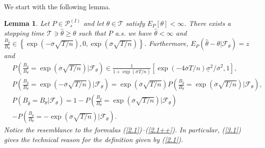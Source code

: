 \documentclass{amsart}
\newtheorem{lem}[thm]{Lemma}
\numberwithin{equation}{section}
\begin{document}
We start with the following lemma.
\begin{lem}\label{lem3.1}
Let $P\in \mathcal P^{(I)}_s$ and let $\theta\in\mathcal T$ satisfy $E_P[\theta]<\infty$.
There exists a stopping time $\mathcal T\ni\hat\theta\geq\theta$ such that $P$ a.s. we have
$\hat\theta<\infty$ and
$\frac{B_{\hat\theta}}{B_{\theta}}\in \left
\{\exp(-\overline{\sigma}\sqrt{T/n}),0,\exp(\overline{\sigma}\sqrt{T/n})
\right\}$. Furthermore,
$E_{P}(\hat\theta-\theta|\mathcal F_{\theta})=z$ and
\begin{eqnarray}\label{3.1}
&P\left(\frac{B_{\hat\theta}}{ B_{\theta}}=\exp(\overline{\sigma}\sqrt{T/n})|\mathcal F_{\theta}\right)
\in \frac{1}{1+\exp(\overline\sigma T/n)}\left[\exp\left(-4\overline\sigma T/n\right)\underline{\sigma}^2/\overline{\sigma}^2,1\right],\\
& P\left(\frac{ B_{\hat\theta}}{ B_{\theta}}=\exp(-\overline{\sigma}\sqrt{T/n})|\mathcal F_{\theta}\right)=\exp(\overline{\sigma}\sqrt {T/n})
P\left(\frac{ B_{\hat\theta}}{ B_{\theta}}=\exp(\overline{\sigma}\sqrt{T/n})|\mathcal F_{\theta}\right)\label{3.2},\\
&P\left({ B_{\hat\theta}}={ B_{\theta}}|\mathcal F_{\theta}\right)=1-
 P\left(\frac{B_{\hat\theta}}{B_{\theta}}=\exp(\overline{\sigma}\sqrt{T/n})|\mathcal F_{\theta}\right)\label{3.3}\\
&-P\left(\frac{B_{\hat\theta}}{B_{\theta}}=-\exp(\overline{\sigma}\sqrt{T/n})|\mathcal F_{\theta}\right).\nonumber
\end{eqnarray}
Notice the resemblance to the formulas (\ref{2.1})--(\ref{2.1++}). In particular, (\ref{3.1}) gives the technical reason for the
definition given by (\ref{2.1}).
\end{lem}
\end{document}
